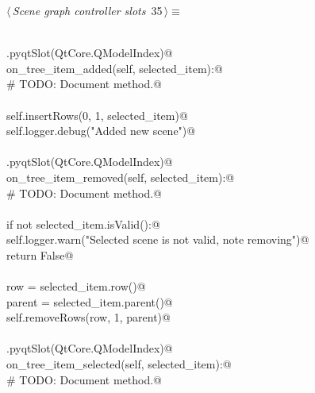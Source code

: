 \documentclass[
    a4paper,      %
    10pt,         %
    openright,    %
    notitlepage,  %
    parskip=half, %
]{scrreprt}       %
\theoremstyle{definition}                    %
\begin{document}
\begin{flushleft} \small
\begin{minipage}{\linewidth}\label{scrap41}\raggedright\small
{} $\langle\,${\itshape Scene graph controller slots}\nobreak\ {\footnotesize {35}}$\,\rangle\equiv$
\vspace{-1ex}
\begin{list}{}{} \item
\mbox{}\lstinline@@\\
\mbox{}\lstinline@QtCore.pyqtSlot(QtCore.QModelIndex)@\\
\mbox{}\lstinline@def on_tree_item_added(self, selected_item):@\\
\mbox{}\lstinline@    # TODO: Document method.@\\
\mbox{}\lstinline@@\\
\mbox{}\lstinline@    self.insertRows(0, 1, selected_item)@\\
\mbox{}\lstinline@    self.logger.debug("Added new scene")@\\
\mbox{}\lstinline@@\\
\mbox{}\lstinline@QtCore.pyqtSlot(QtCore.QModelIndex)@\\
\mbox{}\lstinline@def on_tree_item_removed(self, selected_item):@\\
\mbox{}\lstinline@    # TODO: Document method.@\\
\mbox{}\lstinline@@\\
\mbox{}\lstinline@    if not selected_item.isValid():@\\
\mbox{}\lstinline@        self.logger.warn("Selected scene is not valid, note removing")@\\
\mbox{}\lstinline@        return False@\\
\mbox{}\lstinline@@\\
\mbox{}\lstinline@    row = selected_item.row()@\\
\mbox{}\lstinline@    parent = selected_item.parent()@\\
\mbox{}\lstinline@    self.removeRows(row, 1, parent)@\\
\mbox{}\lstinline@@\\
\mbox{}\lstinline@QtCore.pyqtSlot(QtCore.QModelIndex)@\\
\mbox{}\lstinline@def on_tree_item_selected(self, selected_item):@\\
\mbox{}\lstinline@    # TODO: Document method.@\\
\mbox{}\lstinline@@\\

\end{list}
\end{minipage}
\end{flushleft}
\end{document}
